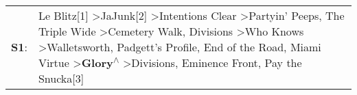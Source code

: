 \begin{supertabular}{p{0.03\textwidth}p{0.92\textwidth}}
 \textbf{S1}:  &  Le Blitz[1]\textsuperscript{} \textgreater \enspace JaJunk[2]\textsuperscript{} \textgreater \enspace Intentions Clear\textsuperscript{} \textgreater \enspace Partyin' Peeps\textsuperscript{}, \enspace The Triple Wide\textsuperscript{} \textgreater \enspace Cemetery Walk\textsuperscript{}, \enspace Divisions\textsuperscript{} \textgreater \enspace Who Knows\textsuperscript{} \textgreater \enspace Walletsworth\textsuperscript{}, \enspace Padgett's Profile\textsuperscript{}, \enspace End of the Road\textsuperscript{}, \enspace Miami Virtue\textsuperscript{} \textgreater \enspace \textbf{Glory\textsuperscript{$\wedge$}} \textgreater \enspace Divisions\textsuperscript{}, \enspace Eminence Front\textsuperscript{}, \enspace Pay the Snucka[3]\textsuperscript{}  \enspace  \\
\end{supertabular}
